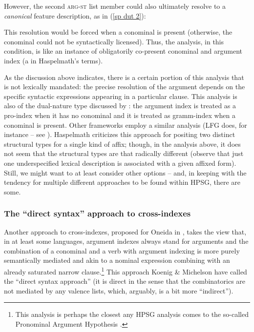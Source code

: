 \documentclass[output=paper
	        ,collection
	        ,collectionchapter
 	        ,biblatex
                ,babelshorthands
                ,newtxmath
                ,draftmode
                ,colorlinks, citecolor=brown
]{langscibook}
\begin{document}
However, the second \textsc{arg-st} list member could also ultimately resolve to a \textit{canonical} feature description, as in (\ref{sp dut 2}):   
%
%
\begin{exe}
\ex\label{sp dut 2}
\end{exe}
%
This resolution would be forced when a conominal is present (otherwise, the conominal could not be syntactically licensed). Thus, the analysis, in this condition, is like an instance of obligatorily co-present conominal and argument index (a  in Haspelmath's terms). 

As the discussion above indicates, there is a certain portion of this analysis that is not lexically mandated: the precise resolution of the argument depends on the specific syntactic expressions appearing in a particular clause. This analysis is also of the dual-nature type discussed by \citet{haspelmath13}: the argument index is treated as a pro-index when it has no conominal and it is treated as gramm-index when a conominal is present. Other frameworks employ a similar analysis (LFG  does, for instance -- see \citealt[Chapter 8]{BATW2015a}). Haspelmath criticizes this approach for positing two distinct structural types for a single kind of affix; though, in the analysis above, it does not seem that the structural types are that radically different (observe that just one underspecified lexical description is associated with a given affixed form). Still, we might want to at least consider other options -- and, in keeping with the tendency for multiple different approaches to be found within HPSG, there are some.  

\subsubsection{The ``direct syntax'' approach to cross-indexes}

Another approach to cross-indexes, proposed for Oneida in \citet{KM15}, takes the view that, in at least some languages, argument indexes always stand for arguments and the combination of a conominal and a verb with argument indexing is more purely semantically mediated and akin to a nominal expression combining with an already saturated narrow clause.\footnote{This analysis is perhaps the closest any HPSG analysis comes to the so-called Pronominal Argument Hypothesis \citep{jelinek84}.} This approach Koenig \& Michelson have called the ``direct syntax approach'' (it is direct in the sense that the combinatorics are not mediated by any valence lists, which, arguably, is a bit more ``indirect''). 
\end{document}
